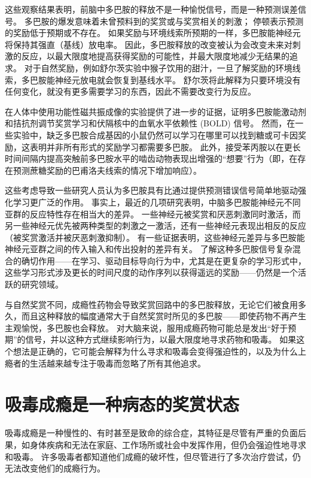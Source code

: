 这些观察结果表明，前脑中多巴胺的释放不是一种愉悦信号，而是一种预测误差信号。 多巴胺的爆发意味着未曾预料到的奖赏或与奖赏相关的刺激； 停顿表示预测的奖励低于预期或不存在。 如果奖励与环境线索所预期的一样，多巴胺能神经元将保持其强直（基线）放电率。 因此，多巴胺释放的改变被认为会改变未来对刺激的反应，以最大限度地提高获得奖励的可能性，并最大限度地减少无结果的追求。 对于自然奖励，例如舒尔茨实验中猴子饮用的甜汁，一旦了解奖励的环境线索，多巴胺能神经元放电就会恢复到基线水平。 舒尔茨将此解释为只要环境没有任何变化，就没有更多需要学习的东西，因此不需要改变行为反应。

在人体中使用功能性磁共振成像的实验提供了进一步的证据，证明多巴胺能激动剂和拮抗剂调节奖赏学习和伏隔核中的血氧水平依赖性 (BOLD) 信号。 然而，在一些实验中，缺乏多巴胺合成基因的小鼠仍然可以学习在哪里可以找到糖或可卡因奖励，这表明并非所有形式的奖励学习都需要多巴胺。 此外，接受苯丙胺以在更长时间间隔内提高突触前多巴胺水平的啮齿动物表现出增强的“想要”行为（即，在存在预测蔗糖奖励的巴甫洛夫线索的情况下增加响应）。

这些考虑导致一些研究人员认为多巴胺具有比通过提供预测错误信号简单地驱动强化学习更广泛的作用。 事实上，最近的几项研究表明，中脑多巴胺能神经元不同亚群的反应特性存在相当大的差异。 一些神经元被奖赏和厌恶刺激同时激活，而另一些神经元优先被两种类型的刺激之一激活，还有一些神经元表现出相反的反应（被奖赏激活并被厌恶刺激抑制）。 有一些证据表明，这些神经元差异与多巴胺能神经元亚群之间的传入输入和传出投射的差异有关。 了解这种多巴胺信号复杂混合的确切作用——在学习、驱动目标导向行为中，尤其是在更复杂的学习形式中，这些学习形式涉及更长的时间尺度的动作序列以获得遥远的奖励——仍然是一个活跃的研究领域。

与自然奖赏不同，成瘾性药物会导致奖赏回路中的多巴胺释放，无论它们被食用多久，而且这种释放的幅度通常大于自然奖赏时所见的多巴胺——即使药物不再产生主观愉悦，多巴胺也会释放。 对大脑来说，服用成瘾药物可能总是发出“好于预期”的信号，并以这种方式继续影响行为，以最大限度地寻求药物和吸毒。 如果这个想法是正确的，它可能会解释为什么寻求和吸毒会变得强迫性的，以及为什么上瘾者的生活越来越专注于吸毒而忽略了所有其他追求。


\section{吸毒成瘾是一种病态的奖赏状态}
吸毒成瘾是一种慢性的、有时甚至是致命的综合症，其特征是尽管有严重的负面后果，如身体疾病和无法在家庭、工作场所或社会中发挥作用，但仍会强迫性地寻求和吸毒。 许多吸毒者都知道他们成瘾的破坏性，但尽管进行了多次治疗尝试，仍无法改变他们的成瘾行为。

